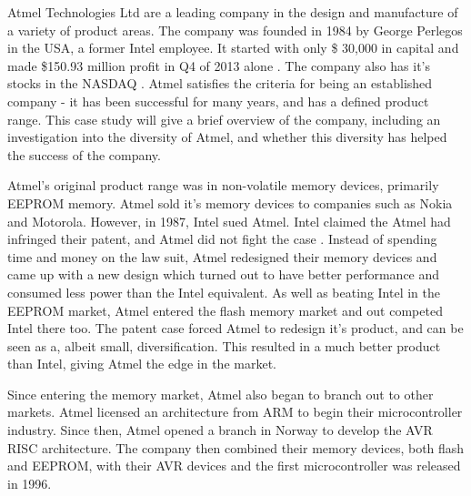 

Atmel Technologies Ltd are a leading company in the design and manufacture of a variety of product areas. 
The company was founded in 1984 by George Perlegos in the USA, a former Intel employee. 
It started with only \$ 30,000 in capital \cite{atmel:capital} and made \$150.93 million profit in Q4 of 2013 alone \cite{atmel:profit}.
The company also has it's stocks in the NASDAQ \cite{atmel:nasdaq}.
Atmel satisfies the criteria for being an established company - it has been successful for many years, and has a defined product range.
This case study will give a brief overview of the company, including an investigation into the diversity of Atmel, and whether this diversity has helped the success of the company.



Atmel's original product range was in non-volatile memory devices, primarily EEPROM memory.
Atmel sold it's memory devices to companies such as Nokia and Motorola.
However, in 1987, Intel sued Atmel.
Intel claimed the Atmel had infringed their patent, and Atmel did not fight the case \cite{atmel:intel}.
Instead of spending time and money on the law suit, Atmel redesigned their memory devices and came up with a new design which turned out to have better performance and consumed less power than the Intel equivalent.
As well as beating Intel in the EEPROM market, Atmel entered the flash memory market and out competed Intel there too.
The patent case forced Atmel to redesign it's product, and can be seen as a, albeit small, diversification.
This resulted in a much better product than Intel, giving Atmel the edge in the market.


Since entering the memory market, Atmel also began to branch out to other markets. 
Atmel licensed an architecture from ARM to begin their microcontroller industry.
Since then, Atmel opened a branch in Norway to develop the AVR RISC architecture.
The company then combined their memory devices, both flash and EEPROM, with their AVR devices and the first microcontroller was released in 1996.

